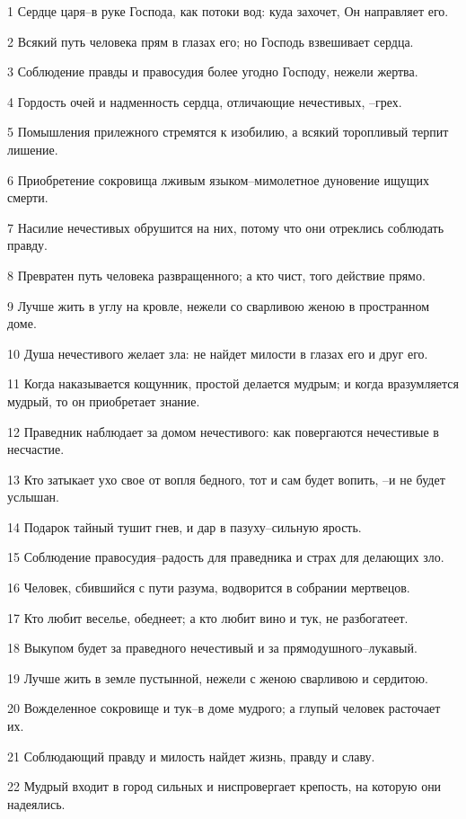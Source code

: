 \par 1 Сердце царя--в руке Господа, как потоки вод: куда захочет, Он направляет его.
\par 2 Всякий путь человека прям в глазах его; но Господь взвешивает сердца.
\par 3 Соблюдение правды и правосудия более угодно Господу, нежели жертва.
\par 4 Гордость очей и надменность сердца, отличающие нечестивых, --грех.
\par 5 Помышления прилежного стремятся к изобилию, а всякий торопливый терпит лишение.
\par 6 Приобретение сокровища лживым языком--мимолетное дуновение ищущих смерти.
\par 7 Насилие нечестивых обрушится на них, потому что они отреклись соблюдать правду.
\par 8 Превратен путь человека развращенного; а кто чист, того действие прямо.
\par 9 Лучше жить в углу на кровле, нежели со сварливою женою в пространном доме.
\par 10 Душа нечестивого желает зла: не найдет милости в глазах его и друг его.
\par 11 Когда наказывается кощунник, простой делается мудрым; и когда вразумляется мудрый, то он приобретает знание.
\par 12 Праведник наблюдает за домом нечестивого: как повергаются нечестивые в несчастие.
\par 13 Кто затыкает ухо свое от вопля бедного, тот и сам будет вопить, --и не будет услышан.
\par 14 Подарок тайный тушит гнев, и дар в пазуху--сильную ярость.
\par 15 Соблюдение правосудия--радость для праведника и страх для делающих зло.
\par 16 Человек, сбившийся с пути разума, водворится в собрании мертвецов.
\par 17 Кто любит веселье, обеднеет; а кто любит вино и тук, не разбогатеет.
\par 18 Выкупом будет за праведного нечестивый и за прямодушного--лукавый.
\par 19 Лучше жить в земле пустынной, нежели с женою сварливою и сердитою.
\par 20 Вожделенное сокровище и тук--в доме мудрого; а глупый человек расточает их.
\par 21 Соблюдающий правду и милость найдет жизнь, правду и славу.
\par 22 Мудрый входит в город сильных и ниспровергает крепость, на которую они надеялись.
